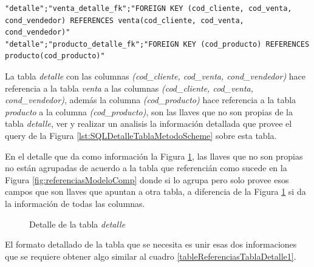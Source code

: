 \lstset{language=sql,breaklines=true}
\begin{lstlisting}
"detalle";"venta_detalle_fk";"FOREIGN KEY (cod_cliente, cod_venta, cond_vendedor) REFERENCES venta(cod_cliente, cod_venta, cond_vendedor)"
"detalle";"producto_detalle_fk";"FOREIGN KEY (cod_producto) REFERENCES producto(cod_producto)"
\end{lstlisting}
La tabla \textit{detalle} con las columnas \textit{(cod\_cliente, cod\_venta, cond\_vendedor)} hace referencia a la tabla \textit{venta} a las columnas \textit{(cod\_cliente, cod\_venta, cond\_vendedor)}, adem\'as la columna \textit{(cod\_producto)} hace referencia a la tabla \textit{producto} a la columna \textit{(cod\_producto)}, son las llaves que no son propias de la tabla \textit{detalle}, ver y realizar un analisis la informaci\'on detallada que provee el query de la Figura \ref{lst:SQLDetalleTablaMetodoScheme} sobre esta tabla.

En el detalle que da como informaci\'on la Figura \ref{fig:detalleTablaDetalle},  las llaves que no son propias no est\'an agrupadas de acuerdo a la tabla que referenci\'an como sucede en la Figura \ref{fig:referenciasModeloComp} donde si lo agrupa pero solo provee esos campos que son llaves que apuntan a otra tabla, a diferencia de la Figura \ref{fig:detalleTablaDetalle} si da la informaci\'on de todas las columnas.

\begin{figure}[H]
\centering
{}
\caption{Detalle de la tabla \textit{detalle}} \label{fig:detalleTablaDetalle}
\end{figure}

El formato detallado de la tabla que se necesita es unir esas dos informaciones que se requiere obtener algo similar al cuadro \ref{tableReferenciasTablaDetalle1}.

